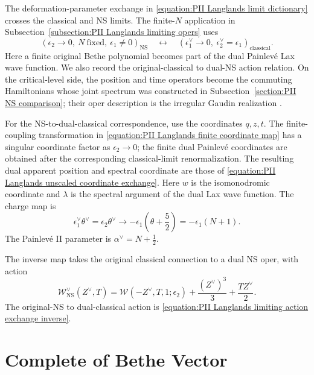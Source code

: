 \documentclass[a4paper,11pt]{article}
\numberwithin{equation}{section}
\begin{document}
The deformation-parameter exchange in
\eqref{equation:PII Langlands limit dictionary} crosses the classical
and NS limits.  The finite-$N$ application in
Subsection~\ref{subsection:PII Langlands limiting opers} uses
\begin{equation}
	(\epsilon_{2}\to0,\ N\ \text{fixed},\ \epsilon_{1}\neq0)_{\mathrm{NS}}
	\quad\longleftrightarrow\quad
	(\epsilon_{1}^{\vee}\to0,\
	\epsilon_{2}^{\vee}=\epsilon_{1})_{\mathrm{classical}}.
\end{equation}
Here a finite original Bethe polynomial becomes part of the dual
Painlev\'e Lax wave function.  We also record the original-classical to dual-NS action relation.
On the critical-level side,
the position and time operators become the commuting Hamiltonians
whose joint spectrum was constructed in Subsection~\ref{section:PII NS comparison}; their oper
description is the irregular Gaudin realization
\cite{FeiginFrenkelToledanoLaredo2010}.

For the NS-to-dual-classical correspondence, use the coordinates
$q,z,t$.  The finite-coupling transformation in
\eqref{equation:PII Langlands finite coordinate map} has a singular
coordinate factor as $\epsilon_2\to0$; the finite dual Painlev\'e
coordinates are obtained after the corresponding classical-limit
renormalization.  The resulting dual apparent position and spectral coordinate are
those of \eqref{equation:PII Langlands unscaled coordinate exchange}.
Here $w$ is the isomonodromic coordinate and $\lambda$ is the
spectral argument of the dual Lax wave function.  The charge map is
\begin{equation}
	\epsilon_1^{\vee}\theta^{\vee}
	=\epsilon_2\theta^{\vee}
	\longrightarrow-\epsilon_{1}\left(\theta+\frac{5}{2}\right)
	=-\epsilon_1(N+1).
\end{equation}
The Painlev\'e II parameter is $\alpha^{\vee}=N+\tfrac{1}{2}$.

The inverse map takes the original classical connection to a dual NS
oper, with action
\begin{equation}
	\label{equation:PII Langlands limiting action exchange}
	\mathcal{W}_{\mathrm{NS}}^{\vee}(Z^{\vee},T)
	=\mathcal{W}(-Z^{\vee},T,1;\epsilon_{2})
	+\frac{(Z^{\vee})^{3}}{3}+\frac{TZ^{\vee}}{2}.
\end{equation}
The original-NS to dual-classical action is
\eqref{equation:PII Langlands limiting action exchange inverse}.

\section{Complete of  Bethe Vector}
\label{appendix:PII finite Bethe calculations}
\end{document}

